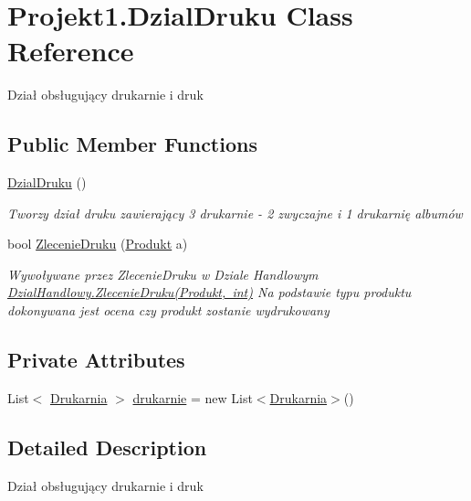 \hypertarget{class_projekt1_1_1_dzial_druku}{}\section{Projekt1.\+Dzial\+Druku Class Reference}
\label{class_projekt1_1_1_dzial_druku}


Dział obsługujący drukarnie i druk  


\subsection*{Public Member Functions}
\begin{DoxyCompactItemize}
\item 
\mbox{\hyperlink{class_projekt1_1_1_dzial_druku_a8fe614a7a09f835bc697ce246ff0d20b}{Dzial\+Druku}} ()
\begin{DoxyCompactList}\small\item\em Tworzy dział druku zawierający 3 drukarnie -\/ 2 zwyczajne i 1 drukarnię albumów \end{DoxyCompactList}\item 
bool \mbox{\hyperlink{class_projekt1_1_1_dzial_druku_add9b31eeff5ca306c6dd033e83978323}{Zlecenie\+Druku}} (\mbox{\hyperlink{class_projekt1_1_1_produkt}{Produkt}} a)
\begin{DoxyCompactList}\small\item\em Wywoływane przez Zlecenie\+Druku w Dziale Handlowym \mbox{\hyperlink{class_projekt1_1_1_dzial_handlowy_a42c78f53cf41e75b39498a7da96e7bc3}{Dzial\+Handlowy.\+Zlecenie\+Druku(\+Produkt, int)}} Na podstawie typu produktu dokonywana jest ocena czy produkt zostanie wydrukowany \end{DoxyCompactList}\end{DoxyCompactItemize}
\subsection*{Private Attributes}
\begin{DoxyCompactItemize}
\item 
List$<$ \mbox{\hyperlink{class_projekt1_1_1_drukarnia}{Drukarnia}} $>$ \mbox{\hyperlink{class_projekt1_1_1_dzial_druku_acf9822fccb837b00ff5fc6030dedd232}{drukarnie}} = new List$<$\mbox{\hyperlink{class_projekt1_1_1_drukarnia}{Drukarnia}}$>$()
\end{DoxyCompactItemize}


\subsection{Detailed Description}
Dział obsługujący drukarnie i druk 




